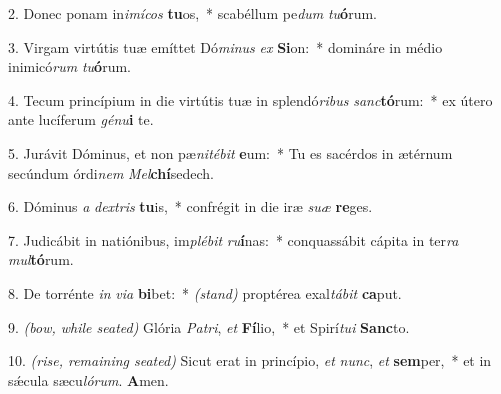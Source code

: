  2. Donec ponam in\textit{i}\textit{mí}\textit{cos} \textbf{tu}os,~* 
 	scabéllum pe\textit{dum} \textit{tu}\textbf{ó}rum.

3. Virgam virtútis tuæ emíttet Dó\textit{mi}\textit{nus} \textit{ex} \textbf{Si}on:~* 
	domináre in médio inimicó\textit{rum} \textit{tu}\textbf{ó}rum.

4. Tecum princípium in die virtútis tuæ in splendó\textit{ri}\textit{bus} \textit{sanc}\textbf{tó}rum:~* 
	ex útero ante lucíferum \textit{gé}\textit{nu}\textbf{i} te.

5. Jurávit Dóminus, et non pæ\textit{ni}\textit{té}\textit{bit} \textbf{e}um:~* 
	Tu es sacérdos in ætérnum secúndum órdi\textit{nem} \textit{Mel}\textbf{chí}sedech.

6. Dóminus \textit{a} \textit{dex}\textit{tris} \textbf{tu}is,~* 
	confrégit in die iræ \textit{su}\textit{æ} \textbf{re}ges.

7. Judicábit in natiónibus, im\textit{plé}\textit{bit} \textit{ru}\textbf{í}nas:~* 
	conquassábit cápita in ter\textit{ra} \textit{mul}\textbf{tó}rum.

8. De torrénte \textit{in} \textit{vi}\textit{a} \textbf{bi}bet:~* 
	{\color{red}\textit{(stand)}} proptérea exal\textit{tá}\textit{bit} \textbf{ca}put.

9. {\color{red}\textit{(bow, while seated)}} Glória \textit{Pa}\textit{tri}, \textit{et} \textbf{Fí}lio,~*
	et Spirí\textit{tu}\textit{i} \textbf{Sanc}to.

10. {\color{red}\textit{(rise, remaining seated)}} Sicut erat in princípio, \textit{et} \textit{nunc}, \textit{et} \textbf{sem}per,~* 
	et in s\'{\ae}cula sæcu\textit{ló}\textit{rum}. \textbf{A}men.